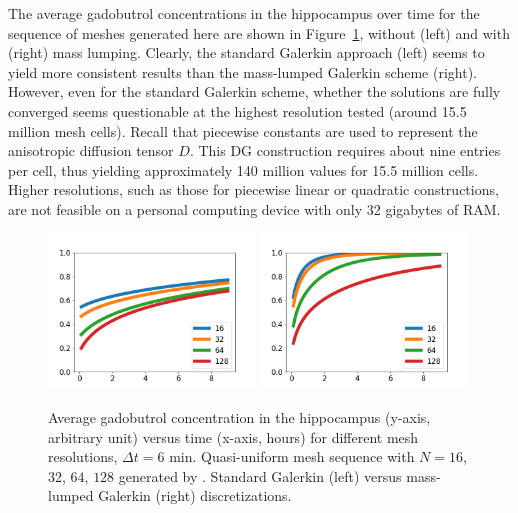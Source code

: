 The average gadobutrol concentrations in the hippocampus over time
for the sequence of meshes generated here are shown in
Figure~\ref{fig:chp6:numerics2}, without (left) and with (right)
mass lumping. Clearly, the standard Galerkin approach (left) seems to
yield more consistent results than the mass-lumped Galerkin scheme
(right). However, even for the standard Galerkin scheme, whether the
solutions are fully converged  seems questionable at the highest
resolution tested (around 15.5 million mesh cells). Recall that piecewise
constants are used to represent the anisotropic diffusion tensor $D$.
This DG construction requires about nine entries per cell, thus yielding
approximately 140 million values for 15.5 million cells. Higher resolutions, such
as those for piecewise linear or quadratic constructions, are not
feasible on a personal computing device with only 32 gigabytes of RAM.
\begin{figure}	
  \includegraphics[width=0.49\textwidth]{./graphics/chp6/tracer_hippocampus_uniform_notlump.png}
  \includegraphics[width=0.49\textwidth]{./graphics/chp6/tracer_hippocampus_uniform_lump.png}
  \caption{Average gadobutrol concentration in the hippocampus (y-axis,
    arbitrary unit) versus time (x-axis, hours) for different mesh
    resolutions, $\Delta t = 6$ min. Quasi-uniform mesh sequence with
    $N=16$, $32$, $64$, $128$ generated by \svmtk. Standard Galerkin (left)
    versus mass-lumped Galerkin (right) discretizations.}
\label{fig:chp6:numerics2}
\end{figure}

